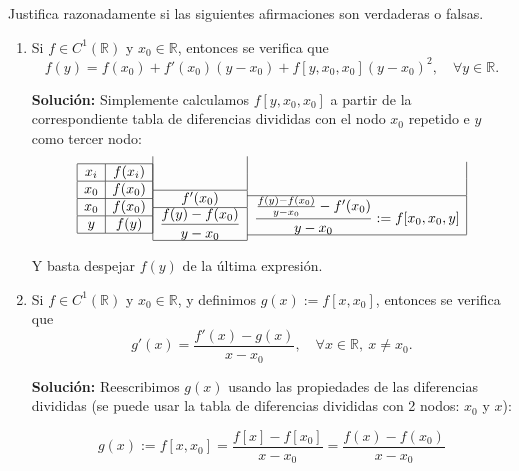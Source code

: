 \documentclass[12pt]{article}
\begin{document}
	\newpage
	\setcounter{ejercicio}{0}
	\begin{ejercicio}[4 puntos]
		Justifica razonadamente si las siguientes afirmaciones son verdaderas o falsas.
		\begin{enumerate}[label=\alph*)]
			\item 	Si $f \in C^1(\mathbb{R})$ y $x_0 \in \mathbb{R}$, entonces se verifica que
			$$ f(y) = f(x_0) + f'(x_0)(y - x_0) + f[y, x_0, x_0](y - x_0)^2, \quad \forall y \in \mathbb{R}.$$
			
				\textbf{Solución:}  Simplemente calculamos $f[y, x_0, x_0]$ a partir de la correspondiente tabla de diferencias divididas con el nodo $x_0$ repetido e $y$ como tercer nodo:
					$$
				\begin{array}{|c|c|}
					\hline
					x_i & f(x_i) \\
					\hline
					x_0 & f(x_0) \\
					\hline
					x_0 & f(x_0) \\
					\hline
					y & f(y) \\
					\hline
				\end{array}
				\begin{array}{|c|}
					\\
					\\
					\hline
					f'(x_0) \\
					\hline
					\displaystyle \frac{f(y)-f(x_0)}{y-x_0} \\
					\hline
				\end{array}
				\begin{array}{c|} 
					\\
					\\
					\hline
					\displaystyle \frac{\frac{f(y)-f(x_0)}{y-x_0} - f'(x_0)}{y-x_0} := f[x_0,x_0,y]\\
					\hline
				\end{array}
				$$
				
				Y basta despejar $f(y)$ de la última expresión.
			
			\item Si $f \in C^1(\mathbb{R})$ y $x_0 \in \mathbb{R}$, y definimos $g(x) := f[x, x_0]$, entonces se verifica que
			$$ g'(x) = \frac{f'(x) - g(x)}{x - x_0}, \quad \forall x \in \mathbb{R}, \ x \ne x_0.$$
			
				\textbf{Solución:}  Reescribimos $g(x)$ usando las propiedades de las diferencias divididas (se puede usar la tabla de diferencias divididas con 2 nodos: $x_0$ y $x$):
				
				$$g(x) := f[x,x_0] = \frac{f[x] - f[x_0]}{x - x_0} = \frac{f(x) - f(x_0)}{x - x_0}$$
				

\end{enumerate}
\end{ejercicio}
\end{document}
